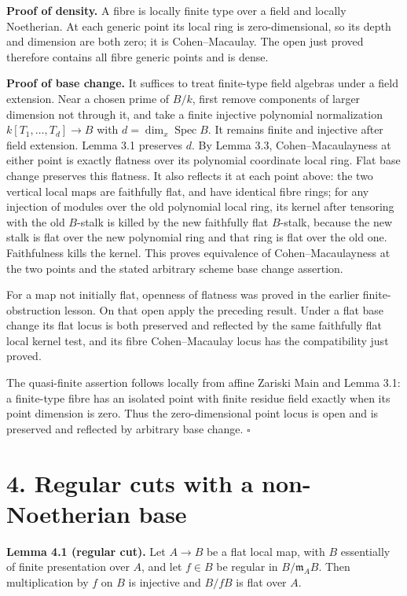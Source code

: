 \documentclass[11pt,a4paper,openany]{report}
\begin{document}
\textbf{Proof of density.} A fibre is locally finite type over a field and locally Noetherian. At each generic point its local ring is zero-dimensional, so its depth and dimension are both zero; it is Cohen--Macaulay. The open just proved therefore contains all fibre generic points and is dense.

\textbf{Proof of base change.} It suffices to treat finite-type field algebras under a field extension. Near a chosen prime of \(B/k\), first remove components of larger dimension not through it, and take a finite injective polynomial normalization \(k[T_1,\ldots,T_d]\to B\) with \(d=\dim_x\operatorname{Spec}B\). It remains finite and injective after field extension. Lemma 3.1 preserves \(d\). By Lemma 3.3, Cohen--Macaulayness at either point is exactly flatness over its polynomial coordinate local ring. Flat base change preserves this flatness. It also reflects it at each point above: the two vertical local maps are faithfully flat, and have identical fibre rings; for any injection of modules over the old polynomial local ring, its kernel after tensoring with the old \(B\)-stalk is killed by the new faithfully flat \(B\)-stalk, because the new stalk is flat over the new polynomial ring and that ring is flat over the old one. Faithfulness kills the kernel. This proves equivalence of Cohen--Macaulayness at the two points and the stated arbitrary scheme base change assertion.

For a map not initially flat, openness of flatness was proved in the earlier finite-obstruction lesson. On that open apply the preceding result. Under a flat base change its flat locus is both preserved and reflected by the same faithfully flat local kernel test, and its fibre Cohen--Macaulay locus has the compatibility just proved.

The quasi-finite assertion follows locally from affine Zariski Main and Lemma 3.1: a finite-type fibre has an isolated point with finite residue field exactly when its point dimension is zero. Thus the zero-dimensional point locus is open and is preserved and reflected by arbitrary base change. \(\square\)

\section{4. Regular cuts with a non-Noetherian base}\label{AG-RG-S07-regular-cuts-with-a-non-noetherian-base}

\textbf{Lemma 4.1 (regular cut).} Let \(A\to B\) be a flat local map, with \(B\) essentially of finite presentation over \(A\), and let \(f\in B\) be regular in \(B/\mathfrak m_AB\). Then multiplication by \(f\) on \(B\) is injective and \(B/fB\) is flat over \(A\).
\end{document}
